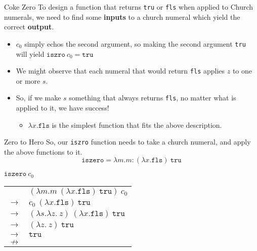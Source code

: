 \documentclass[11pt]{beamer}
\begin{document}
\begin{frame}[fragile=singleslide]{Coke Zero}
To design a function that returns \texttt{tru} or \texttt{fls} when applied to Church numerals, we need to find some \textbf{inputs} to a church numeral which yield the correct \textbf{output}.  
\begin{itemize}
\item $c_0$ simply echos the second argument, so making the second argument \texttt{tru} will yield $\texttt{iszro}\:c_0 = \texttt{tru}$
\item We might observe that each numeral that would return \texttt{fls} applies $z$ to one or more $s$.  
\item So, if we make $s$ something that always returns \texttt{fls}, no matter what is applied to it, we have success! 
\begin{itemize}
\item $\lambda x. \texttt{fls}$ is the simplest function that fits the above description.
\end{itemize}
\end{itemize}
\end{frame}

\begin{frame}[fragile=singleslide]{Zero to Hero}
So, our \texttt{iszro} function needs to take a church numeral, and apply the above functions to it. 
\begin{equation}
\texttt{iszero} = \lambda m. m:(\lambda x. \texttt{fls})\:\texttt{tru}
\end{equation}

\begin{center}
\underline{$\texttt{iszero}\:c_0$} \\
\begin{tabular}{c l}
& $(\lambda m. m\:(\lambda x. \texttt{fls})\:\texttt{tru})\:c_0$ \\ 
$\rightarrow$ & $c_0\:(\lambda x. \texttt{fls})\:\texttt{tru}$ \\
$\rightarrow$ & $(\lambda s. \lambda z.\:z)\:(\lambda x. \texttt{fls})\:\texttt{tru}$ \\
$\rightarrow$ & $(\lambda z.\:z)\:\texttt{tru}$ \\
$\rightarrow$ & $\texttt{tru}$ \\
$\nrightarrow$ &  \\
\end{tabular}
\end{center}

\end{frame}
\end{document}
